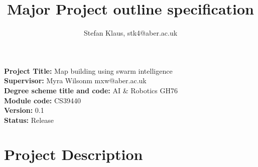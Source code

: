 \documentclass[10pt,a4paper]{article}
\author{Stefan Klaus, stk4@aber.ac.uk}
\title{Major Project outline specification }
\begin{document}
\maketitle
\begin{flushleft}
\textbf{Project Title:} Map building using swarm intelligence \\[3ex]
\textbf{Supervisor:} Myra Wilsonm mxw@aber.ac.uk\\[3ex]
\textbf{Degree scheme title and code:} AI \& Robotics GH76\\[3ex]
\textbf{Module code:} CS39440\\[3ex]
\textbf{Version:} 0.1\\[3ex]
\textbf{Status:} Release\\
\newpage
\section{Project Description }

\end{flushleft}
\end{document}
